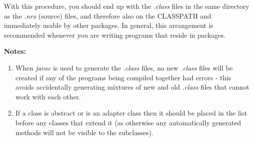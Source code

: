 With this procedure, you should end up with the \emph{.class} files in
the same directory as the \emph{.nrx} (source) files, and therefore also
on the CLASSPATH and immediately usable by other packages.  In general,
this arrangement is recommended whenever you are writing programs that
reside in packages.

\textbf{Notes:}
\begin{enumerate}
\item
When \emph{javac} is used to generate the \emph{.class} files, no
new \emph{.class} files will be created if any of the programs being
compiled together had errors - this avoids accidentally generating
mixtures of new and old \emph{.class} files that cannot work with each
other.
\item
If a class is abstract or is an adapter class then it should be placed
in the list before any classes that extend it (as otherwise any
automatically generated methods will not be visible to the subclasses).
\end{enumerate}






